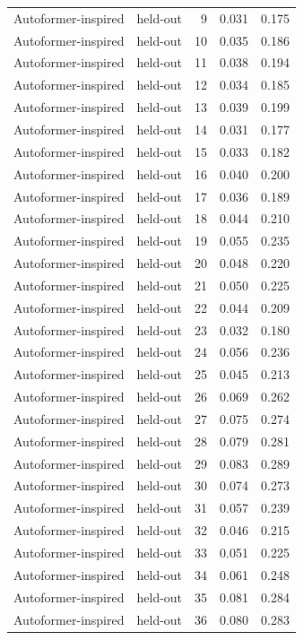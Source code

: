 \begin{tabular}{llrrr}
Autoformer-inspired & held-out & 9 & 0.031 & 0.175 \\
Autoformer-inspired & held-out & 10 & 0.035 & 0.186 \\
Autoformer-inspired & held-out & 11 & 0.038 & 0.194 \\
Autoformer-inspired & held-out & 12 & 0.034 & 0.185 \\
Autoformer-inspired & held-out & 13 & 0.039 & 0.199 \\
Autoformer-inspired & held-out & 14 & 0.031 & 0.177 \\
Autoformer-inspired & held-out & 15 & 0.033 & 0.182 \\
Autoformer-inspired & held-out & 16 & 0.040 & 0.200 \\
Autoformer-inspired & held-out & 17 & 0.036 & 0.189 \\
Autoformer-inspired & held-out & 18 & 0.044 & 0.210 \\
Autoformer-inspired & held-out & 19 & 0.055 & 0.235 \\
Autoformer-inspired & held-out & 20 & 0.048 & 0.220 \\
Autoformer-inspired & held-out & 21 & 0.050 & 0.225 \\
Autoformer-inspired & held-out & 22 & 0.044 & 0.209 \\
Autoformer-inspired & held-out & 23 & 0.032 & 0.180 \\
Autoformer-inspired & held-out & 24 & 0.056 & 0.236 \\
Autoformer-inspired & held-out & 25 & 0.045 & 0.213 \\
Autoformer-inspired & held-out & 26 & 0.069 & 0.262 \\
Autoformer-inspired & held-out & 27 & 0.075 & 0.274 \\
Autoformer-inspired & held-out & 28 & 0.079 & 0.281 \\
Autoformer-inspired & held-out & 29 & 0.083 & 0.289 \\
Autoformer-inspired & held-out & 30 & 0.074 & 0.273 \\
Autoformer-inspired & held-out & 31 & 0.057 & 0.239 \\
Autoformer-inspired & held-out & 32 & 0.046 & 0.215 \\
Autoformer-inspired & held-out & 33 & 0.051 & 0.225 \\
Autoformer-inspired & held-out & 34 & 0.061 & 0.248 \\
Autoformer-inspired & held-out & 35 & 0.081 & 0.284 \\
Autoformer-inspired & held-out & 36 & 0.080 & 0.283 \\

\end{tabular}
